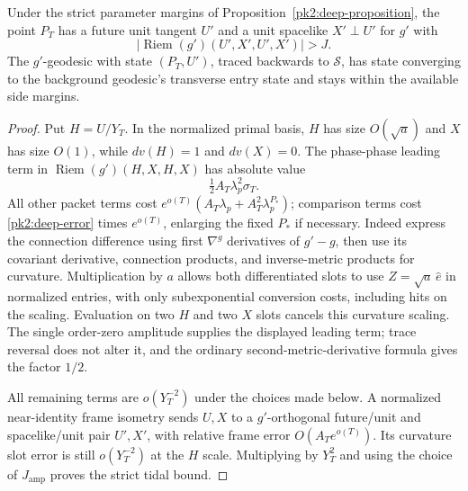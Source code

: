 \begin{lemma}
\label{pk2:observation}
Under the strict parameter margins of
Proposition~\ref{pk2:deep-proposition}, the point $P_T$ has a future
unit tangent $U'$ and a unit spacelike $X'\perp U'$ for $g'$ with
\[
 |\operatorname{Riem}(g')(U',X',U',X')|>J.
\]
The $g'$-geodesic with state $(P_T,U')$, traced backwards to
$\mathcal S$, has state converging to the background geodesic's
transverse entry state and stays within the available side margins.
\end{lemma}
\begin{proof}
Put $H=U/Y_T$. In the normalized primal basis, $H$ has size
$O(\sqrt a)$ and $X$ has size $O(1)$, while $dv(H)=1$ and
$dv(X)=0$. The phase-phase leading term in
$\operatorname{Riem}(g')(H,X,H,X)$ has absolute value
\[
 \tfrac12 A_T\lambda_p^2\sigma_T.
\]
All other packet terms cost
$e^{o(T)}(A_T\lambda_p+A_T^2\lambda_p^{P_*})$; comparison terms
cost \eqref{pk2:deep-error} times $e^{o(T)}$, enlarging the fixed
$P_*$ if necessary. Indeed express the connection difference using
first $\nabla^g$ derivatives of $g'-g$, then use its covariant
derivative, connection products, and inverse-metric products for
curvature. Multiplication by $a$ allows both differentiated slots
to use $Z=\sqrt a\,\hat e$ in normalized entries, with only
subexponential conversion costs, including hits on the scaling.
Evaluation on two $H$ and two $X$ slots cancels this curvature
scaling. The single order-zero amplitude supplies the displayed
leading term; trace reversal does not alter it, and the ordinary
second-metric-derivative formula gives the factor $1/2$.

All remaining terms are $o(Y_T^{-2})$ under the choices made below.
A normalized near-identity frame isometry sends $U,X$ to a
$g'$-orthogonal future/unit and spacelike/unit pair $U',X'$, with
relative frame error $O(A_Te^{o(T)})$. Its curvature slot error is
still $o(Y_T^{-2})$ at the $H$ scale. Multiplying by $Y_T^2$ and
using the choice of $J_{\mathrm{amp}}$ proves the strict tidal bound.


\end{proof}

